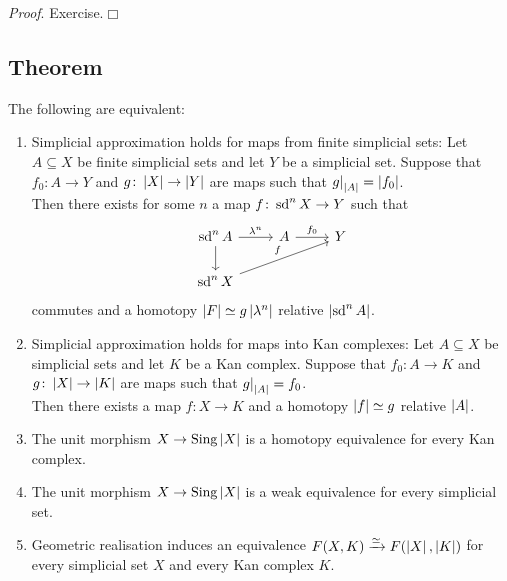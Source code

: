        \emph{Proof}. Exercise.\hfill$\Box$

    \subsection{Theorem}\label{chV-5-6}
        The following are equivalent:
        \begin{enumerate}[label=\roman*)]
            \item 
                Simplicial approximation holds for maps from finite simplicial sets: Let $A \subseteq X$ be finite simplicial sets and let $Y$ be a simplicial set. Suppose that $f_0 \colon A \to Y$ and $g \colon \left| X \right| \to \left| Y \right|$ are maps such that ${g|}_{\left| A \right|} = \left| f_0 \right|$.\\
                Then there exists for some $n$ a map $f \colon \operatorname{sd}^n X \to Y$ such that
                \begin{equation*}
                    \begin{tikzcd}
                        \sd^n A \arrow[d] \arrow[r, "\lambda^n"] & A \arrow[r, "f_0"] & Y \\
                        \sd^n X \arrow[urr, "f"] & &
                    \end{tikzcd}
                \end{equation*}
                commutes and a homotopy $\left| F \right| \simeq g\left| \lambda^n \right|$ relative $\left| \operatorname{sd}^n A \right|$.\label{chV-5-6-1}
            \item 
                Simplicial approximation holds for maps into Kan complexes: Let $A \subseteq X$ be simplicial sets and let $K$ be a Kan complex. Suppose that $f_0 \colon A \to K$ and $g \colon \left| X \right| \to \left| K \right|$ are maps such that ${g|}_{\left| A \right|} = f_0$.\\
                Then there exists a map $f \colon X \to K$ and a homotopy $\left| f \right| \simeq g$ relative $\left| A \right|$.\label{chV-5-6-2}
            \item 
                The unit morphism $X \to \operatorname{Sing} \left| X \right|$ is a homotopy equivalence for every Kan complex. \label{chV-5-6-3}
            \item 
                The unit morphism $X \to \operatorname{Sing} \left| X \right|$ is a weak equivalence for every simplicial set.\label{chV-5-6-4}
            \item 
                Geometric realisation induces an equivalence $F(X, K) \xrightarrow{\simeq} F(\left| X \right|, \left| K \right|)$ for every simplicial set $X$ and every Kan complex $K$.\label{chV-5-6-5}
        \end{enumerate}
        \smallskip

